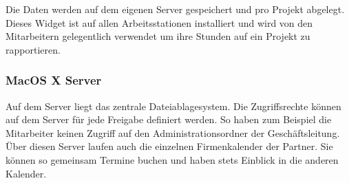 Die Daten werden auf dem
eigenen Server gespeichert und pro Projekt abgelegt. Dieses Widget ist auf allen
Arbeitsstationen installiert und wird von den Mitarbeitern gelegentlich verwendet
um ihre Stunden auf ein Projekt zu rapportieren.

\subsubsection{MacOS X Server}
Auf dem Server liegt das zentrale Dateiablagesystem. Die Zugriffsrechte können
auf dem Server für jede Freigabe definiert werden. So haben zum Beispiel
die Mitarbeiter keinen Zugriff auf den Administrationsordner der Geschäftsleitung.
Über diesen Server laufen auch die einzelnen Firmenkalender der Partner. Sie
können so gemeinsam Termine buchen und haben stets Einblick in die anderen
Kalender.
